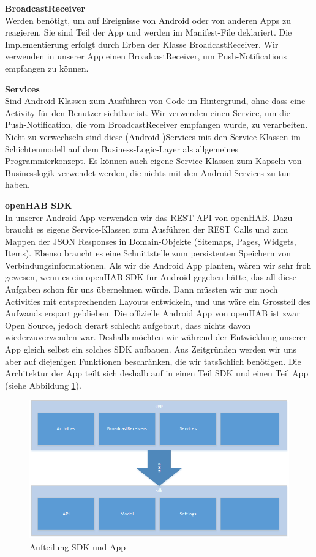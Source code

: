 \textbf{BroadcastReceiver}\\
Werden benötigt, um auf Ereignisse von Android oder von anderen Apps zu reagieren. Sie sind Teil der App und werden im Manifest-File deklariert. Die Implementierung erfolgt durch Erben der Klasse BroadcastReceiver. Wir verwenden in unserer App einen BroadcastReceiver, um Push-Notifications empfangen zu können.

\textbf{Services}\\
Sind Android-Klassen zum Ausführen von Code im Hintergrund, ohne dass eine Activity für den Benutzer sichtbar ist. Wir verwenden einen Service, um die Push-Notification, die vom BroadcastReceiver empfangen wurde, zu verarbeiten. Nicht zu verwechseln sind diese (Android-)Services mit den Service-Klassen im Schichtenmodell auf dem Business-Logic-Layer als allgemeines Programmierkonzept. Es können auch eigene Service-Klassen zum Kapseln von Businesslogik verwendet werden, die nichts mit den Android-Services zu tun haben.

\textbf{openHAB SDK}\\
In unserer Android App verwenden wir das REST-API von openHAB. Dazu braucht es eigene Service-Klassen zum Ausführen der REST Calls und zum Mappen der JSON Responses in Domain-Objekte (Sitemaps, Pages, Widgets, Items). Ebenso braucht es eine Schnittstelle zum persistenten Speichern von Verbindungsinformationen. Als wir die Android App planten, wären wir sehr froh gewesen, wenn es ein openHAB SDK für Android gegeben hätte, das all diese Aufgaben schon für uns übernehmen würde. Dann müssten wir nur noch Activities mit entsprechenden Layouts entwickeln, und uns wäre ein Grossteil des Aufwands erspart geblieben. Die offizielle Android App von openHAB ist zwar Open Source, jedoch derart schlecht aufgebaut, dass nichts davon wiederzuverwenden war. Deshalb möchten wir während der Entwicklung unserer App gleich selbst ein solches SDK aufbauen. Aus Zeitgründen werden wir uns aber auf diejenigen Funktionen beschränken, die wir tatsächlich benötigen. Die Architektur der App teilt sich deshalb auf in einen Teil SDK und einen Teil App (siehe Abbildung \ref{fig:androidArchSdk}). 

\begin{figure}[H]
	\centering
		\includegraphics[width=\textwidth]{report/img/android_arch_sdk.png}
	\caption{Aufteilung SDK und App}
	\label{fig:androidArchSdk}
\end{figure}

